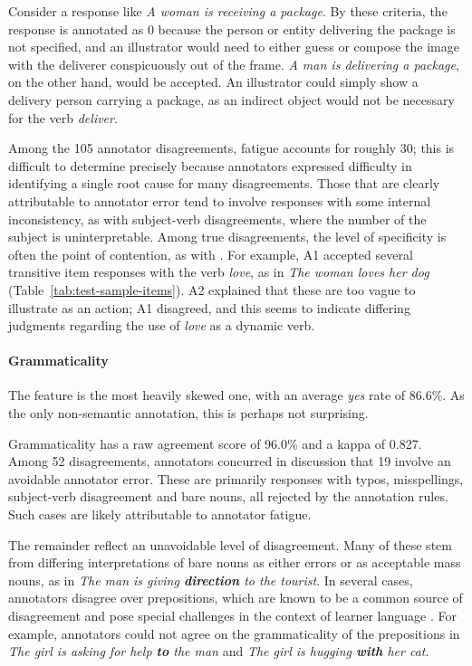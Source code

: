 Consider a response like \textit{A woman is receiving a package}.  By these criteria, the response is annotated as 0 because the person or entity delivering the package is not specified, and an illustrator would need to either guess or compose the image with the deliverer conspicuously out of the frame. \textit{A man is delivering a package}, on the other hand, would be accepted. An illustrator could simply show a delivery person carrying a package, as an indirect object would not be necessary for the verb \textit{deliver}.

Among the 105 annotator disagreements, fatigue accounts for roughly 30; this is difficult to determine precisely because annotators expressed difficulty in identifying a single root cause for many disagreements. Those that are clearly attributable to annotator error tend to involve responses with some internal inconsistency, as with subject-verb disagreements, where the number of the subject is uninterpretable. Among true disagreements, the level of specificity is often the point of contention, as with . For example, A1 accepted several transitive item responses with the verb \textit{love}, as in \textit{The woman loves her dog} (Table~\ref{tab:test-sample-items}). A2 explained that these are too vague to illustrate as an action; A1 disagreed, and this seems to indicate differing judgments regarding the use of \textit{love} as a dynamic verb.

\paragraph{Grammaticality} The  feature is the most heavily skewed one, with an average \textit{yes} rate of 86.6\%.  As the only non-semantic annotation, this is perhaps not surprising.

Grammaticality has a raw agreement score of 96.0\% and a kappa of 0.827. Among 52 disagreements, annotators concurred in discussion that 19 involve an avoidable annotator error. These are primarily responses with typos, misspellings, subject-verb disagreement and bare nouns, all rejected by the annotation rules. Such cases are likely attributable to annotator fatigue.

The remainder reflect an unavoidable level of disagreement. Many of these stem from differing interpretations of bare nouns as either errors or as acceptable mass nouns, as in \textit{The man is giving \textbf{direction} to the tourist}. In several cases, annotators disagree over prepositions, which are known to be a common source of disagreement and pose special challenges in the context of learner language \citep{tetreault-chodorow:2008:HJCL,tetreault:chodorow:08}. For example, annotators could not agree on the grammaticality of the prepositions in \textit{The girl is asking for help \textbf{to} the man} and \textit{The girl is hugging \textbf{with} her cat}. 

